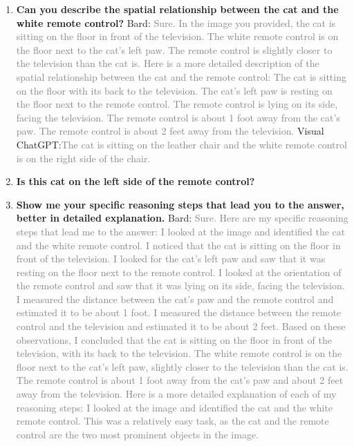     \begin{enumerate}
        \item \textbf{Can you describe the spatial relationship between the cat and the white remote control?}
        \subitem Bard: \textcolor{gray}{    
        Sure. In the image you provided, the cat is sitting on the floor in front of the television. The white remote control is on the floor next to the cat's left paw. The remote control is slightly closer to the television than the cat is.
        Here is a more detailed description of the spatial relationship between the cat and the remote control:
        The cat is sitting on the floor with its back to the television.
        The cat's left paw is resting on the floor next to the remote control.
        The remote control is lying on its side, facing the television.
        The remote control is about 1 foot away from the cat's paw.
        The remote control is about 2 feet away from the television.}
        \subitem Visual ChatGPT:\textcolor{gray}{The cat is sitting on the leather chair and the white remote control is on the right side of the chair.}
        \item \textbf{Is this cat on the left side of the remote control?}
        \item \textbf{Show me your specific reasoning steps that lead you to the answer, better in detailed explanation.}
        \subitem Bard: \textcolor{gray}{Sure. Here are my specific reasoning steps that lead me to the answer:
        I looked at the image and identified the cat and the white remote control.
        I noticed that the cat is sitting on the floor in front of the television.
        I looked for the cat’s left paw and saw that it was resting on the floor next to the remote control.
        I looked at the orientation of the remote control and saw that it was lying on its side, facing the television.
        I measured the distance between the cat’s paw and the remote control and estimated it to be about 1 foot.
        I measured the distance between the remote control and the television and estimated it to be about 2 feet.
        Based on these observations, I concluded that the cat is sitting on the floor in front of the television, with its back to the television. The white remote control is on the floor next to the cat’s left paw, slightly closer to the television than the cat is. The remote control is about 1 foot away from the cat’s paw and about 2 feet away from the television.
        Here is a more detailed explanation of each of my reasoning steps:
        I looked at the image and identified the cat and the white remote control. This was a relatively easy task, as the cat and the remote control are the two most prominent objects in the image.
}
\end{enumerate}
